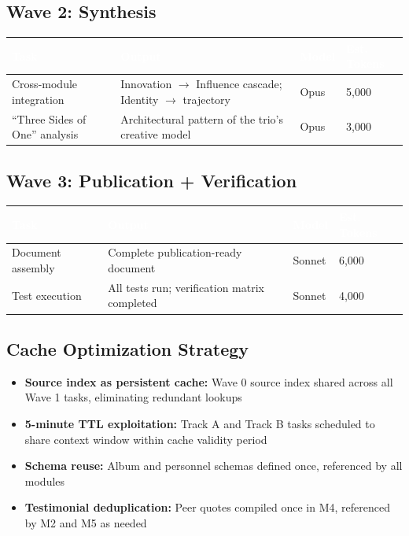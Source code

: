 \documentclass[11pt,letterpaper]{article}
\newcommand{\tableheader}[1]{\textbf{\sffamily\textcolor{white}{#1}}}
\begin{document}
\subsection{Wave 2: Synthesis}

\begin{center}
\begin{tabularx}{\textwidth}{L{3cm}XC{1.5cm}C{2cm}}
\toprule
{}
\tableheader{Task} & \tableheader{Output} & \tableheader{Model} & \tableheader{Est. Tokens} \\
\midrule
Cross-module integration & Innovation $\rightarrow$ Influence cascade; Identity $\rightarrow$ trajectory & Opus & 5,000 \\
``Three Sides of One'' analysis & Architectural pattern of the trio's creative model & Opus & 3,000 \\
\bottomrule
\end{tabularx}
\end{center}

\subsection{Wave 3: Publication + Verification}

\begin{center}
\begin{tabularx}{\textwidth}{L{3cm}XC{1.5cm}C{2cm}}
\toprule
{}
\tableheader{Task} & \tableheader{Output} & \tableheader{Model} & \tableheader{Est. Tokens} \\
\midrule
Document assembly & Complete publication-ready document & Sonnet & 6,000 \\
Test execution & All tests run; verification matrix completed & Sonnet & 4,000 \\
\bottomrule
\end{tabularx}
\end{center}

\subsection{Cache Optimization Strategy}

\begin{itemize}[leftmargin=2em]
\item \textbf{Source index as persistent cache:} Wave 0 source index shared across all Wave 1 tasks, eliminating redundant lookups
\item \textbf{5-minute TTL exploitation:} Track A and Track B tasks scheduled to share context window within cache validity period
\item \textbf{Schema reuse:} Album and personnel schemas defined once, referenced by all modules
\item \textbf{Testimonial deduplication:} Peer quotes compiled once in M4, referenced by M2 and M5 as needed
\end{itemize}
\end{document}
